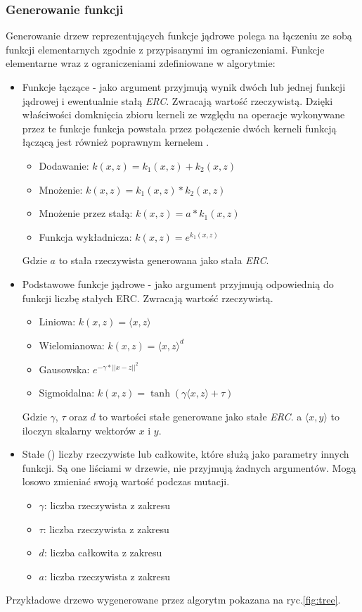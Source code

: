 \documentclass{article}
\begin{document}
\subsubsection{Generowanie funkcji}
Generowanie drzew reprezentujących funkcje jądrowe polega na łączeniu ze sobą funkcji elementarnych zgodnie z  przypisanymi im ograniczeniami.
Funkcje elementarne wraz z ograniczeniami zdefiniowane w algorytmie:
\begin{itemize}
\item Funkcje łączące - jako argument przyjmują wynik dwóch lub jednej funkcji jądrowej i ewentualnie stałą \emph{ERC}. Zwracają wartość rzeczywistą. Dzięki właściwości domknięcia zbioru kerneli ze względu na operacje wykonywane przez te funkcje funkcja powstała przez połączenie dwóch kerneli funkcją łączącą jest również poprawnym kernelem \cite{Shawe-Taylor:2004:KMP:975545}.
	\begin{itemize}
	\item Dodawanie: $ k(x, z) = k_1(x,z) + k_2(x,z) $
	\item Mnożenie: $ k(x, z) = k_1(x,z) * k_2(x,z) $	
	\item Mnożenie przez stałą: $ k(x, z) = a * k_1(x,z) $
	\item Funkcja wykładnicza: $ k(x, z) = e ^{k_1(x,z)} $
	\end{itemize}
	Gdzie $ a $ to stała rzeczywista generowana jako stała \emph{ERC}.
\item Podstawowe funkcje jądrowe - jako argument przyjmują odpowiednią do funkcji liczbę stałych ERC. Zwracają wartość rzeczywistą.
	\begin{itemize}
	\item Liniowa: $ k(x, z) = \langle x,z \rangle $	
	\item Wielomianowa: $ k(x, z) = \langle x,z \rangle ^d $
	\item Gausowska: $ e^{-\gamma*||x-z||^2} $	
	\item Sigmoidalna: $ k(x, z) = \tanh(\gamma \langle x,z \rangle + \tau) $
	\end{itemize}
	Gdzie $ \gamma $, $ \tau $ oraz $ d $ to wartości stałe generowane jako stałe \emph{ERC}. a $ \langle x,y \rangle $ to iloczyn skalarny wektorów $x$ i $y$.
\item Stałe  () liczby rzeczywiste lub całkowite, które służą jako parametry innych funkcji. Są one liściami w drzewie, nie przyjmują żadnych argumentów. Mogą losowo zmieniać swoją wartość podczas mutacji.
	\begin{itemize}
	\item $ \gamma $: liczba rzeczywista z zakresu
	\item $ \tau $: liczba rzeczywista z zakresu
	\item $ d $: liczba całkowita z zakresu
	\item $ a $: liczba rzeczywista z zakresu
	\end{itemize}
\end{itemize}
Przykładowe drzewo wygenerowane przez algorytm pokazana na ryc.\ref{fig:tree}.
\end{document}
